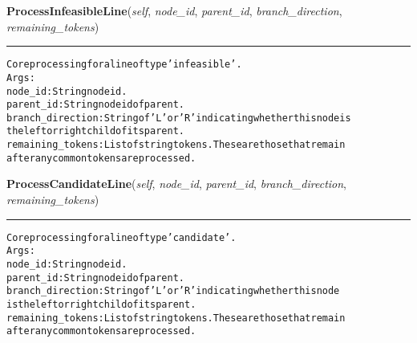     \label{coinor:grumpy:BB:BBTree:ProcessInfeasibleLine}

    \vspace{0.5ex}

\hspace{.8\funcindent}\begin{boxedminipage}{\funcwidth}

    \raggedright \textbf{ProcessInfeasibleLine}(\textit{self}, \textit{node\_id}, \textit{parent\_id}, \textit{branch\_direction}, \textit{remaining\_tokens})

    \vspace{-1.5ex}

    \rule{\textwidth}{0.5\fboxrule}
\setlength{\parskip}{2ex}
\begin{alltt}

Core processing for a line of type 'infeasible'.
Args:
  node\_id: String node id.
  parent\_id: String node id of parent.
  branch\_direction: String of 'L' or 'R' indicating whether this node is
    the left or right child of its parent.
  remaining\_tokens: List of string tokens. These are those that remain
    after any common tokens are processed.
\end{alltt}

\setlength{\parskip}{1ex}
    \end{boxedminipage}

    \label{coinor:grumpy:BB:BBTree:ProcessCandidateLine}

    \vspace{0.5ex}

\hspace{.8\funcindent}\begin{boxedminipage}{\funcwidth}

    \raggedright \textbf{ProcessCandidateLine}(\textit{self}, \textit{node\_id}, \textit{parent\_id}, \textit{branch\_direction}, \textit{remaining\_tokens})

    \vspace{-1.5ex}

    \rule{\textwidth}{0.5\fboxrule}
\setlength{\parskip}{2ex}
\begin{alltt}

Core processing for a line of type 'candidate'.
Args:
  node\_id: String node id.
  parent\_id: String node id of parent.
  branch\_direction: String of 'L' or 'R' indicating whether this node
  is the left or right child of its parent.
  remaining\_tokens: List of string tokens. These are those that remain
    after any common tokens are processed.
\end{alltt}

\setlength{\parskip}{1ex}
    \end{boxedminipage}

